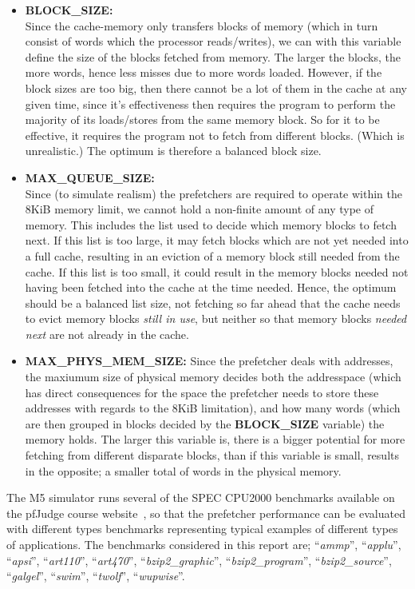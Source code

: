 \begin{itemize}
	\item \textbf{BLOCK\_SIZE:} \\
		Since the cache-memory only transfers blocks of memory (which in turn
		consist of words which the processor reads/writes), we can with this
		variable define the size of the blocks fetched from memory. The larger
		the blocks, the more words, hence less misses due to more words loaded.
		However, if the block sizes are too big, then there cannot be a lot of
		them in the cache at any given time, since it's effectiveness then
		requires the program to perform the majority of its loads/stores from
		the same memory block. So for it to be effective, it requires the
		program not to fetch from different blocks. (Which is unrealistic.) The
		optimum is therefore a balanced block size.
	\item \textbf{MAX\_QUEUE\_SIZE:} \\
		Since (to simulate realism) the prefetchers are required to operate
		within the 8KiB memory limit, we cannot hold a non-finite amount of any
		type of memory. This includes the list used to decide which memory
		blocks to fetch next. If this list is too large, it may fetch blocks
		which are not yet needed into a full cache, resulting in an eviction of
		a memory block still needed from the cache. If this list is too small,
		it could result in the memory blocks needed not having been fetched into
		the cache at the time needed. Hence, the optimum should be a balanced
		list size, not fetching so far ahead that the cache needs to evict
		memory blocks \textit{still in use}, but neither so that memory blocks
		\textit{needed next} are not already in the cache.
	\item \textbf{MAX\_PHYS\_MEM\_SIZE:}
		Since the prefetcher deals with addresses, the maxiumum size of physical
		memory decides both the addresspace (which has direct consequences for
		the space the prefetcher needs to store these addresses with regards to
		the 8KiB limitation), and how many words (which are then grouped in
		blocks decided by the \textbf{BLOCK\_SIZE} variable) the memory holds.
		The larger this variable is, there is a bigger potential for more
		fetching from different disparate blocks, than if this variable is
		small, results in the opposite; a smaller total of words in the physical
		memory.
\end{itemize}

The M5 simulator runs several of the SPEC CPU2000 benchmarks available on the
pfJudge course website~\cite{guidelines}, so that the prefetcher performance can
be evaluated with different types benchmarks representing typical examples of
different types of applications. The benchmarks considered in this report are;
``\emph{ammp}'', ``\emph{applu}'', ``\emph{apsi}'', ``\emph{art110}'',
``\emph{art470}'', ``\emph{bzip2\_graphic}'', ``\emph{bzip2\_program}'',
``\emph{bzip2\_source}'', ``\emph{galgel}'', ``\emph{swim}'', ``\emph{twolf}'',
``\emph{wupwise}''.

